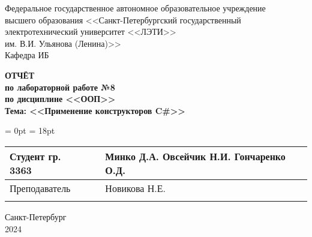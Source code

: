  \thispagestyle{empty}

\begin{center}
	Федеральное государственное автономное образовательное учреждение \\
	высшего образования <<Санкт-Петербургский государственный \\ 
	электротехнический университет <<ЛЭТИ>> \\
	им. В.И. Ульянова (Ленина)>>\\
	Кафедра ИБ\\
\end{center}

\vfill

\begin{center}
	
	{\bfseries ОТЧЁТ \\
	по лабораторной работе №8 \\
	по дисциплине <<ООП>>\\
	Тема: <<Применение конструкторов C\#>>}
\end{center}

\vfill

\begin{table}[H]
	\tabcolsep = 0pt
	\extrarowheight = 18pt
	\begin{tabularx}{\textwidth}{>{\raggedright\arraybackslash}b{6.3cm}>{\raggedright\arraybackslash}b{4.6cm}>{\centering\arraybackslash}X}
		Студент гр. 3363&&Минко Д.А. Овсейчик Н.И. Гончаренко О.Д.\\ \cline{2-2}
		Преподаватель&&Новикова Н.Е.\\ \cline{2-2}
	\end{tabularx}
\end{table}

\begin{center}
	Санкт-Петербург \\ 2024
\end{center}
